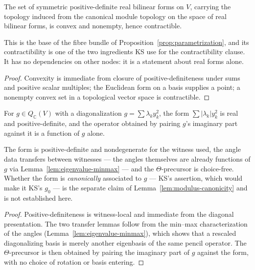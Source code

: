 \begin{lemma}
  \label{lem:posdef-base}
  \leanok
  The set of symmetric positive-definite real bilinear forms on $V$, carrying the
  topology induced from the canonical module topology on the space of real bilinear
  forms, is convex and nonempty, hence contractible.

  This is the base of the fibre bundle of Proposition~\ref{prop:parametrization}, and its
  contractibility is one of the two ingredients KS use for the contractibility clause.
  It has no dependencies on other nodes: it is a statement about real forms alone.
\end{lemma}

\begin{proof}
  \leanok
  Convexity is immediate from closure of positive-definiteness under sums and positive
  scalar multiples; the Euclidean form on a basis supplies a point; a nonempty convex set
  in a topological vector space is contractible.
\end{proof}

\begin{lemma}
  \label{lem:modulus-form}
  \leanok
  For $g \in Q_{\mathbb C}(V)$ with a diagonalization $g = \sum \lambda_k y_k^2$, the form
  $\sum |\lambda_k| y_k^2$ is real and positive-definite, and the operator obtained by
  pairing $g$'s imaginary part against it is a function of $g$ alone.

  The form is positive-definite and nondegenerate for the witness used, the angle data
  transfers between witnesses --- the angles themselves are already functions of $g$ via
  Lemma~\ref{lem:eigenvalue-minmax} --- and the $\Theta$-precursor is choice-free.
  Whether the form is \emph{canonically} associated to $g$ --- KS's assertion, which
  would make it KS's $g_0$ --- is the separate claim of
  Lemma~\ref{lem:modulus-canonicity} and is not established here.
\end{lemma}

\begin{proof}
  \leanok
  Positive-definiteness is witness-local and immediate from the diagonal presentation.
  The two transfer lemmas follow from the min--max characterization of the angles
  (Lemma~\ref{lem:eigenvalue-minmax}), which shows that a rescaled diagonalizing basis is
  merely another eigenbasis of the same pencil operator. The $\Theta$-precursor is then
  obtained by pairing the imaginary part of $g$ against the form, with no choice of
  rotation or basis entering.
\end{proof}

